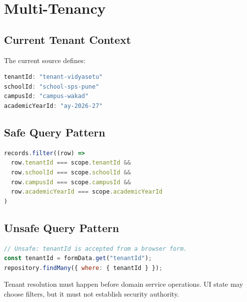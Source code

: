 \chapter{Multi-Tenancy}
\section{Current Tenant Context}
The current source defines:
\begin{lstlisting}[language=JavaScript]
tenantId: "tenant-vidyasetu"
schoolId: "school-sps-pune"
campusId: "campus-wakad"
academicYearId: "ay-2026-27"
\end{lstlisting}



\section{Safe Query Pattern}
\begin{lstlisting}[language=JavaScript]
records.filter((row) =>
  row.tenantId === scope.tenantId &&
  row.schoolId === scope.schoolId &&
  row.campusId === scope.campusId &&
  row.academicYearId === scope.academicYearId
)
\end{lstlisting}

\section{Unsafe Query Pattern}
\begin{lstlisting}[language=JavaScript]
// Unsafe: tenantId is accepted from a browser form.
const tenantId = formData.get("tenantId");
repository.findMany({ where: { tenantId } });
\end{lstlisting}

\begin{importantbox}
Tenant resolution must happen before domain service operations. UI state may choose filters, but it must not establish security authority.
\end{importantbox}

